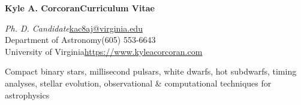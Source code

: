 \documentclass[letterpaper,12pt]{article}
\begin{document}
\noindent\textbf{\huge{Kyle A. Corcoran}\hfill\Large{Curriculum Vitae}}\\
\vspace{-3mm}

\noindent\textit{Ph. D. Candidate}\hfill\href{mailto:kac8aj@virginia.edu}{kac8aj@virginia.edu}\\
\noindent Department of Astronomy\hfill(605) 553-6643\\
\noindent University of Virginia\hfill\url{https://www.kyleacorcoran.com}\\

\noindent{}

\vspace{2mm}
\begin{minipage}{6.1in}
Compact binary stars, millisecond pulsars, white dwarfs, hot subdwarfs, timing analyses, stellar evolution, observational \& computational techniques for astrophysics
\end{minipage}

\vspace{3mm}
\noindent{}
\end{document}

